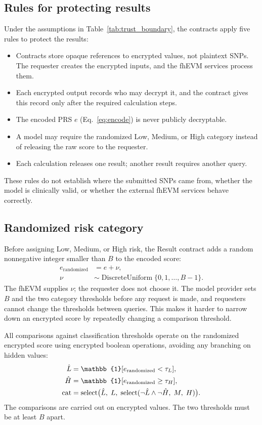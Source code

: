 \documentclass[10pt]{article}
\begin{document}
\subsection{Rules for protecting results}

Under the assumptions in Table~\ref{tab:trust_boundary}, the contracts apply five
rules to protect the results:
\begin{itemize}
  \item Contracts store opaque references to encrypted values, not plaintext SNPs.
        The requester creates the encrypted inputs, and the fhEVM services process them.
  \item Each encrypted output records who may decrypt it, and the contract gives this
        record only after the required calculation steps.
  \item The encoded PRS $e$ (Eq.~\ref{eq:encode}) is never publicly decryptable.
  \item A model may require the randomized Low, Medium, or High category instead of
        releasing the raw score to the requester.
  \item Each calculation releases one result; another result requires another query.
\end{itemize}
These rules do not establish where the submitted SNPs came from, whether the model is
clinically valid, or whether the external fhEVM services behave correctly.

\subsection{Randomized risk category}

Before assigning Low, Medium, or High risk, the Result contract adds a random
nonnegative integer smaller than $B$ to the encoded score:
\begin{equation}
\begin{aligned}
e_{\mathrm{randomized}} &= e + \nu,\\
\nu &\sim \operatorname{DiscreteUniform}\{0,1,\ldots,B-1\}.
\end{aligned}
\end{equation}
The fhEVM supplies $\nu$; the requester does not choose it.  The model provider sets $B$
and the two category thresholds before any request is made, and requesters cannot
change the thresholds between queries.  This makes it harder to narrow down an
encrypted score by repeatedly changing a comparison threshold.

All comparisons against classification thresholds operate on the randomized encrypted
score using encrypted boolean operations, avoiding any branching on hidden values:
\begin{align}
\hat{L} &= \mathbb{1}[e_{\mathrm{randomized}} < \tau_L], \notag\\
\hat{H} &= \mathbb{1}[e_{\mathrm{randomized}} \geq \tau_H], \notag\\
\mathrm{cat} &= \mathrm{select}\bigl(\hat{L},\;L,\;\mathrm{select}(\neg\hat{L}\wedge\neg\hat{H},\;M,\;H)\bigr).
\label{eq:classify}
\end{align}
The comparisons are carried out on encrypted values.  The two thresholds must be at
least $B$ apart.
\end{document}
